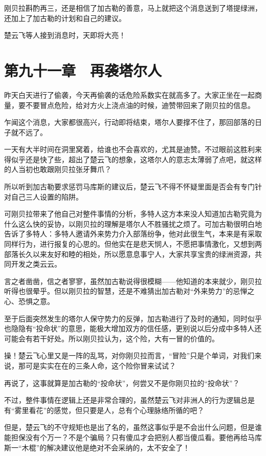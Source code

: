刚贝拉斟酌再三，还是相信了加古勒的善意，马上就把这个消息送到了塔提绿洲，还加上了加古勒的计划和自己的建议。

楚云飞等人接到消息时，天即将大亮！

\section{第九十一章　再袭塔尔人}

昨天白天进行了偷袭，今天再偷袭的话危险系数实在就高多了。大家正坐在一起商量，要不要冒点危险，给对方火上浇点油的时候，迪赞带回来了刚贝拉的信息。

乍闻这个消息，大家都很高兴，行动即将结束，塔尔人要撑不住了，那回部落的日子就不远了。

一天有大半时间在洞里窝着，给谁也不会喜欢的，尤其是迪赞。不过眼前这胜利来得似乎还是快了些，超出了楚云飞的想象，这塔尔人的意志太薄弱了点吧，就这样的人当初也敢跟刚贝拉张牙舞爪？

所以听到加古勒要求惩罚马库斯的建议后，楚云飞不得不怀疑里面是否会有专门针对自己三人设置的陷阱。

可刚贝拉带来了他自己对整件事情的分析，多特人这方本来没人知道加古勒究竟为什么这么快的妥协，以刚贝拉的理解是塔尔人不胜骚扰之烦了。可加古勒很明白地告诉了多特人：多特人邀请外来势力介入部落纷争，他对此很生气，本来是有采取同样行为，进行报复的心思的。但他实在是悲天悯人，不愿把事情激化，又想到两部落长久以来友好和睦的相处，所以愿意息事宁人，大家共享宝贵的绿洲资源，共同开发之类云云。

言之者凿凿，信之者寥寥，虽然加古勒说得很模糊——他知道的本来就少，刚贝拉听得也很晕乎。但以刚贝拉的智慧，还是不难猜出加古勒对“外来势力”的忌惮之心、恐惧之意。

至于后面突然发生的塔尔人保守势力的反弹，加古勒进行了及时的通知，同时似乎也隐隐有“投命状”的意思，能极大增加双方的信任感，更别说以后分成中多特人还可能会有若干好处。所以刚贝拉认为，这个险，大有一冒的价值的。

操！楚云飞心里又是一阵的乱骂，对你刚贝拉而言，“冒险”只是个单词，对我们来说，那可是实实在在的三条人命，这个险你冒来试试？

再说了，这事就算是加古勒的“投命状”，何尝又不是你刚贝拉的“投命状”？

不过，整件事情在逻辑上还是非常合理的，虽然楚云飞对非洲人的行为逻辑总是有“雾里看花”的感觉，但只要是人，总有个心理脉络所循的吧？

但是，楚云飞的不守规矩也是出了名的，虽然这事似乎是不会出什么问题，但是谁能担保没有个万一？不是个骗局？只有傻瓜才会把别人都当傻瓜看。要他再给马库斯一“木棍”的解决建议他是绝对不会采纳的，太不安全了！

